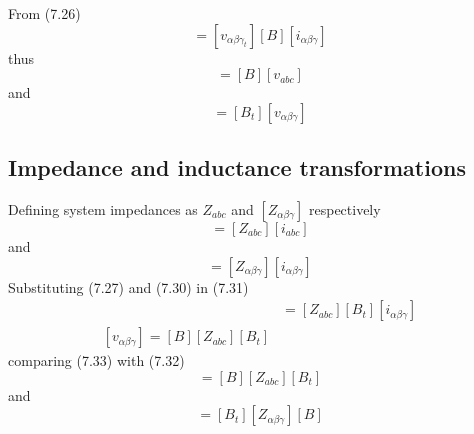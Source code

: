 \documentclass[a4paper,numbers=noenddot,12pt]{scrbook}
\begin{document}
    From (7.26)
    \begin{equation*}
        [v_{abc_{t}}][i_{abc}] = [v_{\alpha \beta \gamma_{t}}][B][i_{\alpha \beta \gamma}]
        \label{}
    \end{equation*}
    thus
    \begin{equation}
        [v_{\alpha \beta \gamma}] = [B] [v_{abc}]
        \label{eq:Eq7.29}
    \end{equation}
    and
    \begin{equation}
        [v_{abc}] = [B_t] [v_{\alpha \beta \gamma}]
        \label{eq:Eq7.30}
    \end{equation}

    \subsection{Impedance and inductance transformations} Defining system impedances as $Z_{abc}$ and $[Z_{\alpha \beta \gamma}]$ respectively
    \begin{equation}
        [v_{abc}] = [Z_{abc}] [i_{abc}]
        \label{eq:Eq7.31}
    \end{equation}
    and
    \begin{equation}
        [v_{\alpha \beta \gamma}] = [Z_{\alpha \beta \gamma}] [i_{\alpha \beta \gamma}]
        \label{eq:Eq7.32}
    \end{equation}
    Substituting (7.27) and (7.30) in (7.31)
    \begin{align}
        [B_t][v_{\alpha \beta \gamma}] & =[Z_{abc}] [B_t] [i_{\alpha \beta \gamma}] \nonumber \\
        [v_{\alpha \beta \gamma}] = [B][Z_{abc}][B_t]
        \label{eq:Eq7.33}
    \end{align}
    comparing (7.33) with (7.32)
    \begin{equation}
        [Z_{\alpha \beta \gamma}] = [B][Z_{abc}] [B_t]
        \label{eq:7.34}
    \end{equation}
    and
    \begin{equation}
        [Z_{abc}] = [B_t] [Z_{\alpha \beta \gamma}][B]
        \label{eq:Eq7.35}
    \end{equation}
\end{document}
